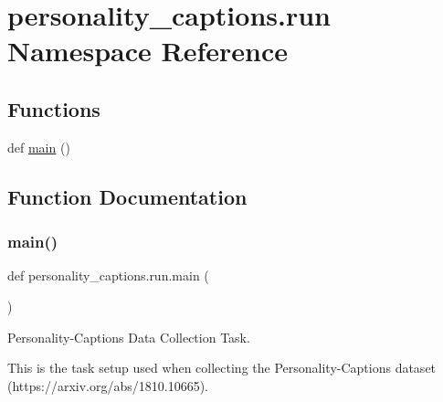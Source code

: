 \hypertarget{namespacepersonality__captions_1_1run}{}\section{personality\+\_\+captions.\+run Namespace Reference}
\label{namespacepersonality__captions_1_1run}
\subsection*{Functions}
\begin{DoxyCompactItemize}
\item 
def \hyperlink{namespacepersonality__captions_1_1run_a6cc04d2f2bf859221adef60a6ea0857f}{main} ()
\end{DoxyCompactItemize}


\subsection{Function Documentation}
\mbox{\label{namespacepersonality__captions_1_1run_a6cc04d2f2bf859221adef60a6ea0857f}} 
\subsubsection{\texorpdfstring{main()}{main()}}
{\footnotesize\ttfamily def personality\+\_\+captions.\+run.\+main (\begin{DoxyParamCaption}{ }\end{DoxyParamCaption})}

\begin{DoxyVerb}Personality-Captions Data Collection Task.

This is the task setup used when collecting the Personality-Captions dataset
(https://arxiv.org/abs/1810.10665).
\end{DoxyVerb}
 
